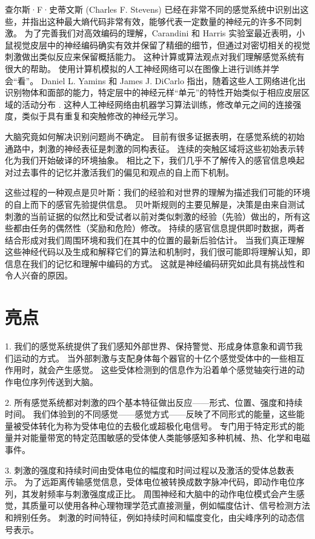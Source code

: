 查尔斯·F·史蒂文斯 (Charles F. Stevens) 已经在非常不同的感觉系统中识别出这些，并指出这种最大熵代码非常有效，能够代表一定数量的神经元的许多不同刺激。 为了完善我们对高效编码的理解，Carandini 和 Harris 实验室最近表明，小鼠视觉皮层中的神经编码确实有效并保留了精细的细节，但通过对密切相关的视觉刺激做出类似反应来保留概括能力。 这种计算或算法观点对我们理解感觉系统有很大的帮助。 使用计算机模拟的人工神经网络可以在图像上进行训练并学会“看”。 Daniel L. Yamins 和 James J. DiCarlo 指出，随着这些人工网络进化出识别物体和面部的能力，特定层中的神经元样“单元”的特性开始类似于相应皮层区域的活动分布 . 这种人工神经网络由机器学习算法训练，修改单元之间的连接强度，类似于具有重复和突触修改的神经元学习。

大脑究竟如何解决识别问题尚不确定。 目前有很多证据表明，在感觉系统的初始通路中，刺激的神经表征是刺激的同构表征。 连续的突触区域将这些初始表示转化为我们开始破译的环境抽象。 相比之下，我们几乎不了解传入的感官信息唤起对过去事件的记忆并激活我们的偏见和观点的自上而下机制。

这些过程的一种观点是贝叶斯：我们的经验和对世界的理解为描述我们可能的环境的自上而下的感官先验提供信息。 贝叶斯规则的主要见解是，决策是由来自测试刺激的当前证据的似然比和受试者以前对类似刺激的经验（先验）做出的，所有这些都由任务的偶然性（奖励和危险）修改。 持续的感官信息提供即时数据，两者结合形成对我们周围环境和我们在其中的位置的最新后验估计。 当我们真正理解这些神经代码以及生成和解释它们的算法和机制时，我们很可能即将理解认知，即信息在我们的记忆和理解中编码的方式。 这就是神经编码研究如此具有挑战性和令人兴奋的原因。



\section{亮点}

1. 我们的感觉系统提供了我们感知外部世界、保持警觉、形成身体意象和调节我们运动的方式。 当外部刺激与支配身体每个器官的十亿个感觉受体中的一些相互作用时，就会产生感觉。 这些受体检测到的信息作为沿着单个感觉轴突行进的动作电位序列传送到大脑。 

2. 所有感觉系统都对刺激的四个基本特征做出反应——形式、位置、强度和持续时间。 我们体验到的不同感觉——感觉方式——反映了不同形式的能量，这些能量被受体转化为称为受体电位的去极化或超极化电信号。 专门用于特定形式的能量并对能量带宽的特定范围敏感的受体使人类能够感知多种机械、热、化学和电磁事件。 

3. 刺激的强度和持续时间由受体电位的幅度和时间过程以及激活的受体总数表示。 为了远距离传输感觉信息，受体电位被转换成数字脉冲代码，即动作电位序列，其发射频率与刺激强度成正比。 周围神经和大脑中的动作电位模式会产生感觉，其质量可以使用各种心理物理学范式直接测量，例如幅度估计、信号检测方法和辨别任务。 刺激的时间特征，例如持续时间和幅度变化，由尖峰序列的动态信号表示。 

